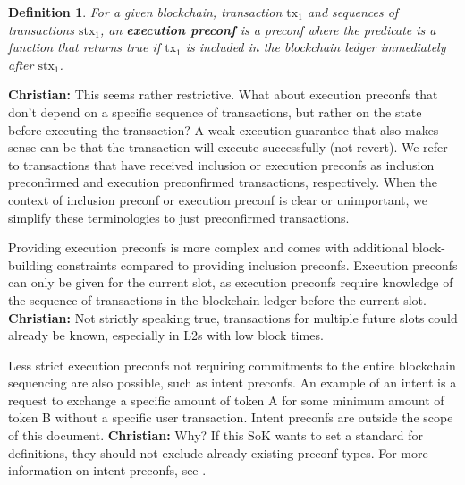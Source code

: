 \documentclass[a4paper]{article}
\theoremstyle{boldstyle}
\newtheorem{definitionx}{Definition}
\newenvironment{definition}
  {\begin{defopenboxq}\begin{definitionx}}
  {\end{definitionx}\end{defopenboxq}}
\newcommand{\cm}[1]{\textcolor{blue}{\textbf{Conor:} #1}}
\newcommand{\chm}[1]{\textcolor{OliveGreen}{\textbf{Christian:} #1}}
\begin{document}
        \begin{definition}
        For a given blockchain, transaction $\mathrm{tx_1}$ and sequences of transactions $\mathrm{stx}_1$, an \textbf{execution preconf} is a preconf where the predicate is a function that returns true if $\mathrm{tx_1}$ is included in the blockchain ledger immediately after $\mathrm{stx}_1$.
        \end{definition}
        \chm{This seems rather restrictive. What about execution preconfs that don't depend on a specific sequence of transactions, but rather on the state before executing the transaction? A weak execution guarantee that also makes sense can be that the transaction will execute successfully (not revert).}
        We refer to transactions that have received inclusion or execution preconfs as inclusion preconfirmed and execution preconfirmed transactions, respectively. When the context of inclusion preconf or execution preconf is clear or unimportant, we simplify these terminologies to just preconfirmed transactions.
        
        Providing execution preconfs is more complex and comes with additional block-building constraints compared to providing inclusion preconfs. Execution preconfs can only be given for the current slot, as execution preconfs require knowledge of the sequence of transactions in the blockchain ledger before the current slot. \chm{Not strictly speaking true, transactions for multiple future slots could already be known, especially in L2s with low block times.}
        
        Less strict execution preconfs not requiring commitments to the entire blockchain sequencing are also possible, such as intent preconfs. An example of an intent is a request to exchange a specific amount of token A for some minimum amount of token B without a specific user transaction. Intent preconfs are outside the scope of this document. \chm{Why? If this SoK wants to set a standard for definitions, they should not exclude already existing preconf types.} For more information on intent preconfs, see \cite{W:Intent-BasedArchitectureandTheirRisks, ERC-7521}.
\end{document}

